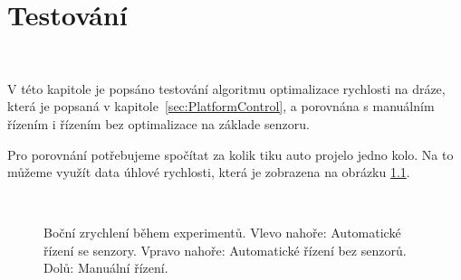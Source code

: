 \chapter{Testování}
\label{sec:Testing}
\

V této kapitole je popsáno testování algoritmu optimalizace rychlosti na dráze,
která je popsaná v kapitole~\ref{sec:PlatformControl}, a porovnána s manuálním
řízením i řízením bez optimalizace na základe senzoru.

Pro porovnání potřebujeme spočítat za kolik tiku auto projelo jedno kolo. Na to můžeme využít data
úhlové rychlosti, která je zobrazena na obrázku \ref{fig:Laps}.

\begin{figure}[!h]
    \centering
     \\
    \captionsetup{justification=centering}
    \caption{Boční zrychlení během experimentů. Vlevo nahoře: Automatické řízení se senzory. Vpravo nahoře: Automatické řízení bez senzorů. Dolů: Manuální řízení.}
    \label{fig:Laps}
\end{figure}

